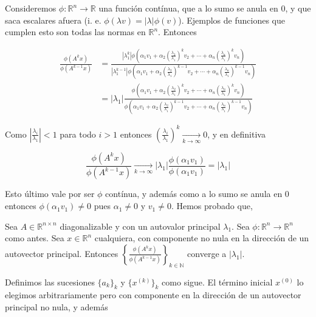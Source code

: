 Consideremos $\phi:\mathbb{R}^n \to \mathbb{R}$ una función contínua, que a lo sumo se anula en 0, y que saca escalares afuera (i. e. $\phi(\lambda v) = |\lambda| \phi(v)$). Ejemplos de funciones que cumplen esto son todas las normas en $\mathbb{R}^n$. Entonces

\begin{align*}
\frac{\phi(A^k x)}{\phi(A^{k - 1} x)} &= 
\frac{|\lambda_1^k| \phi \left(\alpha_1 v_1 + \alpha_2 \left(\frac{\lambda_2}{\lambda_1}\right)^k v_2 + \cdots + \alpha_n \left(\frac{\lambda_n}{\lambda_1}\right)^k v_n\right)}
{|\lambda_1^{k - 1}|\phi\left(\alpha_1 v_1 + \alpha_2 \left(\frac{\lambda_2}{\lambda_1}\right)^{k - 1} v_2 + \cdots + 
\alpha_n \left(\frac{\lambda_n}{\lambda_1}\right)^{k - 1} v_n\right)} \\
&= |\lambda_1|\frac{\phi \left(\alpha_1 v_1 + \alpha_2 \left(\frac{\lambda_2}{\lambda_1}\right)^k v_2 + \cdots + \alpha_n \left(\frac{\lambda_n}{\lambda_1}\right)^k v_n\right)}
{\phi\left(\alpha_1 v_1 + \alpha_2 \left(\frac{\lambda_2}{\lambda_1}\right)^{k - 1} v_2 + \cdots + 
\alpha_n \left(\frac{\lambda_n}{\lambda_1}\right)^{k - 1} v_n\right)} 
\end{align*}

Como $|\frac{\lambda_i}{\lambda_1}| < 1$ para todo $i > 1$ entonces $\left(\frac{\lambda_i}{\lambda_1}\right)^k \xrightarrow[k \to \infty]{} 0$, y en definitiva

\[\frac{\phi(A^k x)}{\phi(A^{k - 1} x)} \xrightarrow[k \to \infty]{} |\lambda_1| \frac{\phi(\alpha_1 v_1)}{\phi(\alpha_1 v_1)} = |\lambda_1|\]

Esto último vale por ser $\phi$ contínua, y además como a lo sumo se anula en 0 entonces $\phi(\alpha_1 v_1) \neq 0$ pues $\alpha_1 \neq 0$ y $v_1 \neq 0$. Hemos probado que,

\begin{propo}
Sea $A \in \mathbb{R}^{n \times n}$ diagonalizable y con un autovalor principal $\lambda_1$. Sea $\phi : \mathbb{R}^n \to \mathbb{R}^n$ como antes. Sea $x \in \mathbb{R}^n$ cualquiera, con componente no nula en la dirección de un autovector principal. Entonces $\left\lbrace\frac{\phi(A^k x)}{\phi(A^{k - 1} x)}\right\rbrace_{k \in \mathbb{N}}$ converge a $|\lambda_1|$.
\end{propo}


Definimos las sucesiones $\{a_k\}_k$ y $\{x^{(k)}\}_k$ como sigue. El término inicial $x^{(0)}$ lo elegimos arbitrariamente pero con componente en la dirección de un autovector principal no nula, y además

